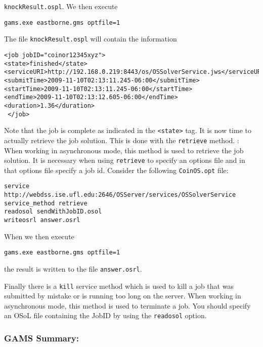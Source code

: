 {\tt knockResult.ospl}. We then execute
\vskip 8pt
\begin{verbatim}
gams.exe eastborne.gms optfile=1
\end{verbatim}
The file {\tt knockResult.ospl} will contain the information
\begin{verbatim}
<job jobID="coinor12345xyz">
<state>finished</state>
<serviceURI>http://192.168.0.219:8443/os/OSSolverService.jws</serviceURI>
<submitTime>2009-11-10T02:13:11.245-06:00</submitTime>
<startTime>2009-11-10T02:13:11.245-06:00</startTime>
<endTime>2009-11-10T02:13:12.605-06:00</endTime>
<duration>1.36</duration>
 </job>
\end{verbatim}
Note that the job is complete as indicated in the {\tt <state>} tag. It is now time to actually retrieve 
the job solution.  This is done with the {\tt retrieve} method.
\vskip 8pt
: When working in asynchronous mode, this method is used 
to retrieve the job solution. It is necessary when using {\tt retrieve} %
to specify an options file and in that options file specify a job id.   
Consider the following {\tt CoinOS.opt} file:
\vskip 8pt
\begin{verbatim}
service http://webdss.ise.ufl.edu:2646/OSServer/services/OSSolverService
service_method retrieve
readosol sendWithJobID.osol
writeosrl answer.osrl
\end{verbatim}
When we then execute
\vskip 8pt
\begin{verbatim}
gams.exe eastborne.gms optfile=1
\end{verbatim}
the result is written to the file {\tt answer.osrl}. 

Finally there is a {\tt kill} service method which is used to kill a job that was submitted by mistake 
or is running too long on the server. 
\vskip 8pt
 When working in asynchronous mode, this method is used to terminate 
a job. You should specify an OSoL  file containing the JobID by using the {\tt readosol} option.
\vskip 8pt


\subsubsection{GAMS Summary:}\label{section:gamssummary}


